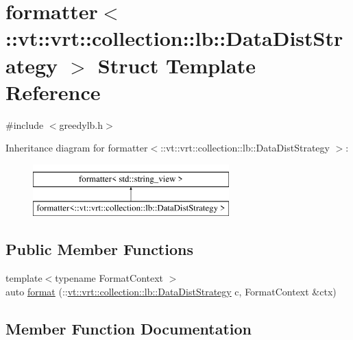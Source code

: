 \hypertarget{structformatter_3_1_1vt_1_1vrt_1_1collection_1_1lb_1_1_data_dist_strategy_01_4}{}\section{formatter$<$\+:\+:vt\+:\+:vrt\+:\+:collection\+:\+:lb\+:\+:Data\+Dist\+Strategy $>$ Struct Template Reference}
\label{structformatter_3_1_1vt_1_1vrt_1_1collection_1_1lb_1_1_data_dist_strategy_01_4}


{\ttfamily \#include $<$greedylb.\+h$>$}

Inheritance diagram for formatter$<$\+:\+:vt\+:\+:vrt\+:\+:collection\+:\+:lb\+:\+:Data\+Dist\+Strategy $>$\+:\begin{figure}[H]
\begin{center}
\leavevmode
\includegraphics[height=2.000000cm]{structformatter_3_1_1vt_1_1vrt_1_1collection_1_1lb_1_1_data_dist_strategy_01_4}
\end{center}
\end{figure}
\subsection*{Public Member Functions}
\begin{DoxyCompactItemize}
\item 
{\footnotesize template$<$typename Format\+Context $>$ }\\auto \hyperlink{structformatter_3_1_1vt_1_1vrt_1_1collection_1_1lb_1_1_data_dist_strategy_01_4_a10951e101590195f918b82279aea0ae7}{format} (\+::\hyperlink{namespacevt_1_1vrt_1_1collection_1_1lb_a0c49bf89a59ba0fd5160bc3894417dfa}{vt\+::vrt\+::collection\+::lb\+::\+Data\+Dist\+Strategy} c, Format\+Context \&ctx)
\end{DoxyCompactItemize}


\subsection{Member Function Documentation}
\mbox{\label{structformatter_3_1_1vt_1_1vrt_1_1collection_1_1lb_1_1_data_dist_strategy_01_4_a10951e101590195f918b82279aea0ae7}} 

